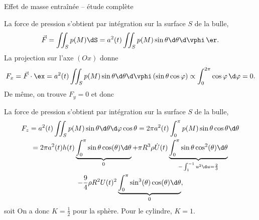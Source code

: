 \begin{exo}[PC][1][devoir]{Effet de masse entraînée -- étude complète}
\begin{quest}
\begin{enumerate}
{
La force de pression s’obtient par intégration sur la surface $S$ de la bulle,
$$\Vec{F} = \iint_S p(M) \dS = a^2(t)  \iint_S p(M) \sin \theta \d \theta \d \vphi \,\er.
$$
La projection sur l’axe $(Ox)$ donne 
$$
F_x = \Vec{F} \cdot \ex =  a^2(t)  \iint_S p(M) \sin \theta \d \theta \d \vphi \,(\sin\theta \cos\varphi) \propto \int_0^{2\pi} \cos\varphi \, \d \varphi = 0.
$$
De même, on trouve $F_y=0$ et donc

}

{
La force de pression s’obtient par intégration sur la surface $S$ de la bulle,
\begin{multline*}
F_z = a^2(t) \iint_S p(M)  \sin \theta \d \theta \d \varphi \cos \theta = 2\pi a^2(t) \int_0^\pi p(M)  \sin \theta \cos \theta  \d \theta \\ = 2\pi a^2(t) h(t) \underbrace{\int_0^\pi \sin \theta \cos(\theta) \d \theta }_{0} +  \pi R^3 \rho \dot{U} (t) \underbrace{\int_0^\pi \sin \theta \cos^2(\theta) \d \theta }_{-\int_1^{-1} u^2 \d u = \frac{2}{3}}  \\ -\frac{9}{4}\rho R^2 U(t)^2  \underbrace{\int_0^\pi \sin^3(\theta) \cos(\theta) \d \theta}_{0},
\end{multline*}
soit 
On a donc $K=\frac{1}{2}$ pour la sphère. Pour le cylindre, $K=1$.
}


\end{enumerate}
\end{quest}
\end{exo}

